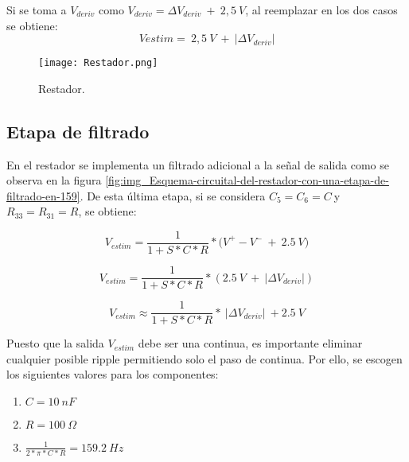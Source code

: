 \noindent Si se toma a $V_{deriv}$ como $V_{deriv}=\mathit{\Delta}V_{deriv}\ +\ 2,5\: V$, al reemplazar en los dos casos se obtiene:
\begin{equation} \label{eq_rest_3}
	Vestim=\ 2,5\ V\ +\ |\mathit{\Delta}V_{deriv}|
\end{equation}

\begin{figure}[H]
	\centering
	\texttt{[image: Restador.png]}
	\caption{Restador.}
	\label{fig:img_Restador}
\end{figure}

\subsection{Etapa de filtrado}

\noindent En el restador se implementa un filtrado adicional a la se\~{n}al de salida como se observa en la figura  \ref{fig:img_Esquema-circuital-del-restador-con-una-etapa-de-filtrado-en-159}. De esta \'{u}ltima etapa, si se considera $C_5=C_6=C\ $y $R_{33}=R_{31}=R$, se obtiene:



\begin{equation}
	V_{estim}=\frac{1}{1+S*C*R}*{(V}^+-V^-\ +\ 2.5\:V)
\end{equation}

\begin{equation} \label{eq_Vestim_1}
	V_{estim}=\frac{1}{1+S*C*R}*(2.5\: V\ +\ |\mathit{\Delta}V_{deriv}|)
\end{equation}

\begin{equation} \label{eq_Vestim_2}
	V_{estim} \approx \frac{1}{1+S*C*R}*\ |\mathit{\Delta}V_{deriv}|\ +2.5\:V
\end{equation}



\noindent Puesto que la salida $V_{estim}$ debe ser una continua, es importante eliminar cualquier posible ripple permitiendo solo el paso de continua. Por ello, se escogen los siguientes valores para los componentes:

\begin{enumerate}
	\item  $C=10\: nF$
	
	\item  $R=100\:\Omega$
	
	\item  $\frac{1}{2*\pi *C*R}=159.2\: Hz$
\end{enumerate}

